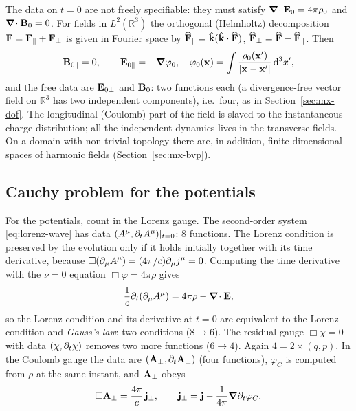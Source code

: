 The data on $t=0$ are not freely specifiable: they must satisfy
$\boldsymbol{\nabla}\!\cdot\mathbf{E}_0=4\pi\rho_0$ and $\boldsymbol{\nabla}\!\cdot\mathbf{B}_0=0$.  For fields in $L^2(\mathbb R^3)$
the orthogonal (Helmholtz) decomposition $\mathbf{F}=\mathbf{F}_\parallel+\mathbf{F}_\perp$ is
given in Fourier space by $\widehat{\mathbf{F}}_\parallel=\hat{\mathbf{k}}(\hat{\mathbf{k}}\cdot\widehat{\mathbf{F}})$, $\widehat{\mathbf{F}}_\perp=\widehat{\mathbf{F}}-\widehat{\mathbf{F}}_\parallel$.  Then
\begin{equation}
\mathbf{B}_{0\parallel}=0,\qquad
\mathbf{E}_{0\parallel}=-\boldsymbol{\nabla}\varphi_0,\quad \varphi_0(\mathbf{x})=\int\frac{\rho_0(\mathbf{x}')}{|\mathbf{x}-\mathbf{x}'|}\,\mathrm{d}^3x',
\end{equation}
and the free data are $\mathbf{E}_{0\perp}$ and $\mathbf{B}_0$: two functions each
(a divergence-free vector field on $\mathbb R^3$ has two independent
components), i.e.\ four, as in Section~\ref{sec:mx-dof}.  The longitudinal
(Coulomb) part of the field is slaved to the instantaneous charge
distribution; all the independent dynamics lives in the transverse
fields.  On a domain with non-trivial topology there are, in addition,
finite-dimensional spaces of harmonic fields (Section~\ref{sec:mx-bvp}).

\subsection{Cauchy problem for the potentials}

For the potentials, count in the Lorenz gauge.  The second-order system
\eqref{eq:lorenz-wave} has data $(A^\mu,\partial_tA^\mu)|_{t=0}$: $8$
functions.  The Lorenz condition is preserved by the evolution only if it
holds initially together with its time derivative, because
$\Box(\partial_\mu A^\mu)=(4\pi/c)\partial_\mu j^\mu=0$.  Computing the time derivative
with the $\nu=0$ equation $\Box\varphi=4\pi\rho$ gives
\begin{equation}
\frac1c\partial_t(\partial_\mu A^\mu)=4\pi\rho-\boldsymbol{\nabla}\!\cdot\mathbf{E} ,
\end{equation}
so the Lorenz condition and its derivative at $t=0$ are equivalent to the
Lorenz condition and \emph{Gauss's law}: two conditions ($8\to6$).  The
residual gauge $\Box\chi=0$ with data $(\chi,\partial_t\chi)$ removes two more
functions ($6\to4$).  Again $4=2\times(q,p)$.  In the Coulomb gauge the
data are $(\mathbf{A}_\perp,\partial_t\mathbf{A}_\perp)$ (four functions), $\varphi_C$ is
computed from $\rho$ at the same instant, and $\mathbf{A}_\perp$ obeys
\begin{equation}
\Box\mathbf{A}_\perp=\frac{4\pi}{c}\,\mathbf{j}_\perp,\qquad \mathbf{j}_\perp=\mathbf{j}-\frac1{4\pi}\boldsymbol{\nabla}\partial_t\varphi_C .
\end{equation}

